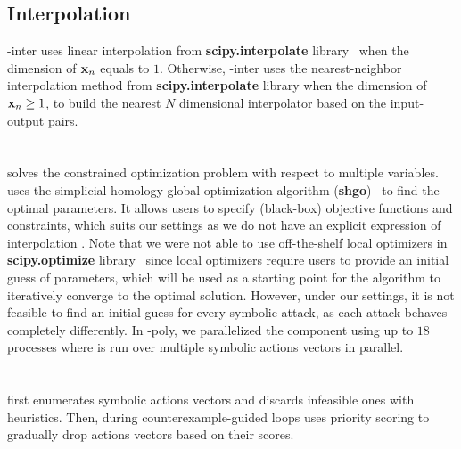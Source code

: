 \subsection{Interpolation {\approximators}}
{\name}-inter uses linear interpolation from \textbf{scipy.interpolate} library~\cite{2020SciPy-NMeth} when the dimension of $\textbf{x}_n$ equals to $1$. Otherwise, {\name}-inter uses the nearest-neighbor interpolation method from \textbf{scipy.interpolate} library when the dimension of $\textbf{x}_n \geq 1$, to build the nearest $N$ dimensional interpolator based on the input-output pairs.  



\section{{\optimizer}}
\label{sec:optimizer}
{\optimizer} solves the constrained optimization problem with respect to multiple variables. {\optimizer} uses the simplicial homology global optimization algorithm (\textbf{shgo})~\cite{joe2008constructing,endres2018simplicial,wales2015perspective} to find the optimal parameters. It allows users to specify (black-box) objective functions and constraints, which suits our settings as we do not have an explicit expression of interpolation {\approximators}. Note that we were not able to use off-the-shelf local optimizers in \textbf{scipy.optimize} library~\cite{2020SciPy-NMeth} since local optimizers require users to provide an initial guess of parameters, which will be used as a starting point for the algorithm to iteratively converge to the optimal solution. However, under our settings, it is not feasible to find an initial guess for every symbolic attack, as each attack behaves completely differently. In {\name}-poly, we parallelized the {\optimizer} component using up to $18$ processes where {\optimizer} is run over multiple symbolic actions vectors in parallel.


\section{{\synthesizer}}
\label{sec:synthesizer}
{\synthesizer} first enumerates symbolic actions vectors and discards infeasible ones with heuristics. Then, during counterexample-guided loops {\synthesizer} uses priority scoring to gradually drop actions vectors based on their scores. 

